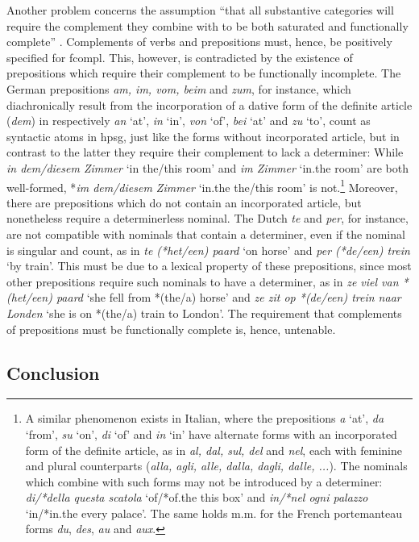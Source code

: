 \documentclass[output=paper]{langsci/langscibook}
\begin{document}
Another problem concerns the assumption ``that all substantive categories will 
require the complement they combine with to be both saturated and 
functionally complete'' \citep[311]{Netter94}. Complements of verbs and 
prepositions must, hence, be positively specified for {\sc fcompl}. 
This, however, is contradicted by the existence of 
prepositions which require their complement to be functionally incomplete. 
The German prepositions {\it am, im, vom, beim\/} and {\it zum}, for instance, 
which diachronically result from the incorporation of a dative form of the 
definite article ({\it dem\/}) in respectively {\it an\/} `at', 
{\it in\/} `in', {\it von\/} `of', {\it bei\/} `at' and {\it zu\/} `to',
count as syntactic atoms in {\sc hpsg}, just like 
the forms without incorporated article, but in contrast to the 
latter they require their complement to lack a determiner: While  
{\it in dem/diesem Zimmer\/} `in the/this room' and {\it im Zimmer\/} `in.the room'
are both well-formed, *{\it im dem/diesem Zimmer} `in.the the/this room' is 
not.\footnote{A similar phenomenon exists in Italian, where the prepositions 
{\it a\/} `at', {\it da\/} `from', {\it su\/} `on', {\it di\/} `of' and {\it in\/} `in' 
have alternate forms with an incorporated form of the definite article, as in  
{\it al, dal, sul, del\/} and {\it nel}, each with 
feminine and plural counterparts ({\it alla, agli, alle, dalla, dagli, dalle, ...}). 
The nominals which combine with such forms may not be introduced by a determiner:
{\it di/*della questa scatola\/} `of/*of.the this box' and {\it in/*nel ogni palazzo\/} 
`in/*in.the every palace'. The same holds m.m. for the French 
portemanteau forms {\it du\/}, {\it des\/}, {\it au\/} and {\it aux}.}   
Moreover, there are prepositions which do not contain an 
incorporated article, but nonetheless require a determinerless nominal. 
The Dutch {\it te\/} and {\it per}, for instance, are not compatible with nominals 
that contain a determiner, even if the nominal is singular and count, 
as in {\it te (*het/een) paard\/} `on horse' and {\it per (*de/een) trein\/} `by train'.   
This must be due to a lexical property of these prepositions, 
since most other prepositions require such nominals to have 
a determiner, as in {\it ze viel van *(het/een) paard\/} `she fell from *(the/a) horse' 
and {\it ze zit op *(de/een) trein naar Londen\/} `she is on *(the/a) train to London'.  
The requirement that complements of prepositions must be functionally complete is,
hence, untenable.  


\subsection{Conclusion} 
\end{document}

